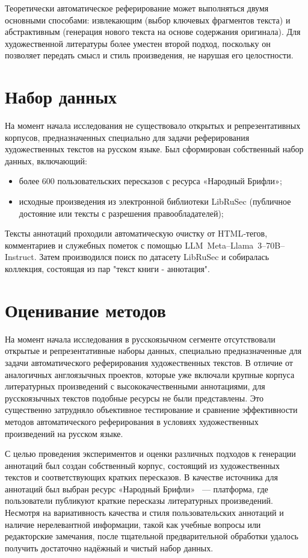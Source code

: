 \documentclass{article}
\theoremstyle{definition}
\theoremstyle{plain}
\begin{document}
Теоретически автоматическое реферирование может выполняться двумя основными способами: извлекающим (выбор ключевых фрагментов текста) и абстрактивным (генерация нового текста на основе содержания оригинала). Для художественной литературы более уместен второй подход, поскольку он позволяет передать смысл и стиль произведения, не нарушая его целостности.

\section*{Набор данных}
На момент начала исследования не существовало открытых и репрезентативных корпусов, предназначенных специально для задачи реферирования художественных текстов на русском языке. Был сформирован собственный набор данных, включающий:
\begin{itemize}
  \item более 600 пользовательских пересказов с ресурса «Народный Брифли»;
  \item исходные произведения из электронной библиотеки LibRuSec (публичное достояние или тексты с разрешения правообладателей);
\end{itemize}
Тексты аннотаций проходили автоматическую очистку от HTML‑тегов, комментариев и служебных пометок с помощью LLM~Meta--Llama~3--70B--Instruct. Затем производился поиск по датасету LibRuSec и собиралась коллекция, состоящая из пар "текст книги - аннотация".

\section*{Оценивание методов}
На момент начала исследования в русскоязычном сегменте отсутствовали открытые и репрезентативные наборы данных, специально предназначенные для задачи автоматического реферирования художественных текстов.
В отличие от аналогичных англоязычных проектов, которые уже включали крупные корпуса литературных произведений с высококачественными аннотациями, для русскоязычных текстов подобные ресурсы не были представлены. 
Это существенно затрудняло объективное тестирование и сравнение эффективности методов автоматического реферирования в условиях художественных произведений на русском языке.

С целью проведения экспериментов и оценки различных подходов к генерации аннотаций был создан собственный корпус, состоящий из художественных текстов и соответствующих кратких пересказов. 
В качестве источника для аннотаций был выбран ресурс «Народный Брифли»~\cite{Briefly} — платформа, где пользователи публикуют краткие пересказы литературных произведений. 
Несмотря на вариативность качества и стиля пользовательских аннотаций и наличие нерелевантной информации, такой как учебные вопросы или редакторские замечания, после тщательной предварительной обработки удалось получить достаточно надёжный и чистый набор данных.
\end{document}
